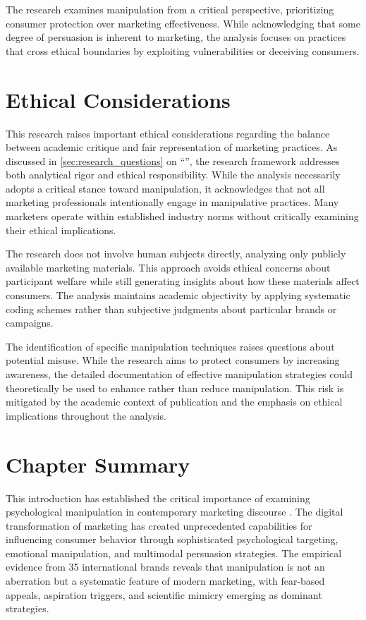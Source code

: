 The research examines manipulation from a critical perspective, prioritizing consumer protection over marketing effectiveness. While acknowledging that some degree of persuasion is inherent to marketing, the analysis focuses on practices that cross ethical boundaries by exploiting vulnerabilities or deceiving consumers.

\section{Ethical Considerations}
\label{sec:ethical_considerations}

This research raises important ethical considerations regarding the balance between academic critique and fair representation of marketing practices. As discussed in \autoref{sec:research_questions} on ``'', the research framework addresses both analytical rigor and ethical responsibility. While the analysis necessarily adopts a critical stance toward manipulation, it acknowledges that not all marketing professionals intentionally engage in manipulative practices. Many marketers operate within established industry norms without critically examining their ethical implications.

The research does not involve human subjects directly, analyzing only publicly available marketing materials. This approach avoids ethical concerns about participant welfare while still generating insights about how these materials affect consumers. The analysis maintains academic objectivity by applying systematic coding schemes rather than subjective judgments about particular brands or campaigns.

The identification of specific manipulation techniques raises questions about potential misuse. While the research aims to protect consumers by increasing awareness, the detailed documentation of effective manipulation strategies could theoretically be used to enhance rather than reduce manipulation. This risk is mitigated by the academic context of publication and the emphasis on ethical implications throughout the analysis.

\section{Chapter Summary}
\label{sec:chapter_summary}

This introduction has established the critical importance of examining psychological manipulation in contemporary marketing discourse \cite{fairclough2015language}. The digital transformation of marketing has created unprecedented capabilities for influencing consumer behavior through sophisticated psychological targeting, emotional manipulation, and multimodal persuasion strategies. The empirical evidence from 35 international brands reveals that manipulation is not an aberration but a systematic feature of modern marketing, with fear-based appeals, aspiration triggers, and scientific mimicry emerging as dominant strategies.

